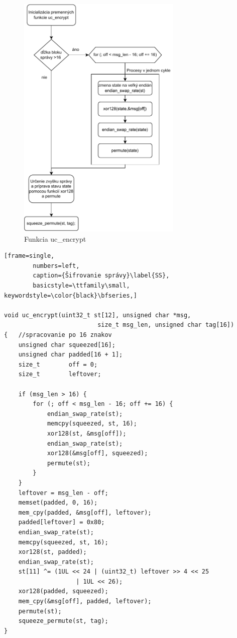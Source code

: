 \begin{figure}
	\centering
	\includegraphics[width=0.7\textwidth]{figures/fc3}
	\caption{Funkcia uc\_encrypt}
	\label{fc3}
\end{figure}

\begin{minipage}{\linewidth} 	
	\begin{lstlisting}[frame=single,
		numbers=left,
		caption={Šifrovanie správy}\label{SS},
		basicstyle=\ttfamily\small, keywordstyle=\color{black}\bfseries,]
 		
void uc_encrypt(uint32_t st[12], unsigned char *msg, 
					      size_t msg_len, unsigned char tag[16])
{	//spracovanie po 16 znakov
	unsigned char squeezed[16];
	unsigned char padded[16 + 1];
	size_t        off = 0;
	size_t        leftover;
	
	if (msg_len > 16) {
		for (; off < msg_len - 16; off += 16) {
			endian_swap_rate(st);
			memcpy(squeezed, st, 16);
			xor128(st, &msg[off]);
			endian_swap_rate(st);
			xor128(&msg[off], squeezed);
			permute(st);
		}
	}
	leftover = msg_len - off;
	memset(padded, 0, 16);
	mem_cpy(padded, &msg[off], leftover);
	padded[leftover] = 0x80;
	endian_swap_rate(st);
	memcpy(squeezed, st, 16);
	xor128(st, padded);
	endian_swap_rate(st);
	st[11] ^= (1UL << 24 | (uint32_t) leftover >> 4 << 25
				    | 1UL << 26); 
	xor128(padded, squeezed);
	mem_cpy(&msg[off], padded, leftover);
	permute(st);
	squeeze_permute(st, tag);
}
  	\end{lstlisting}
\end{minipage}\\ 

